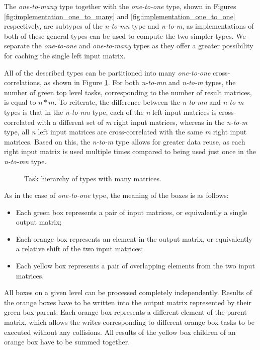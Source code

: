 The \textit{one-to-many} type together with the \textit{one-to-one} type, shown in Figures \ref{fig:implementation_one_to_many} and \ref{fig:implementation_one_to_one} respectively, are subtypes of the \textit{n-to-mn} type and \textit{n-to-m}, as implementations of both of these general types can be used to compute the two simpler types. We separate the \textit{one-to-one} and \textit{one-to-many} types as they offer a greater possibility for caching the single left input matrix.

All of the described types can be partitioned into many \textit{one-to-one} cross-correlations, as shown in Figure \ref{fig:cross_corr_many_tasks}. For both \textit{n-to-mn} and \textit{n-to-m} types, the number of green top level tasks, corresponding to the number of result matrices, is equal to $n*m$. To reiterate, the difference between the \textit{n-to-mn} and \textit{n-to-m} types is that in the \textit{n-to-mn} type, each of the \textit{n} left input matrices is cross-correlated with a different set of \textit{m} right input matrices, whereas in the \textit{n-to-m} type, all \textit{n} left input matrices are cross-correlated with the same \textit{m} right input matrices. Based on this, the \textit{n-to-m} type allows for greater data reuse, as each right input matrix is used multiple times compared to being used just once in the \textit{n-to-mn} type. 

\begin{figure}[ht]
	\centering
	\def\svgwidth{0.8\textwidth}
	
	\caption{Task hierarchy of types with many matrices.}
	\label{fig:cross_corr_many_tasks}
\end{figure}

As in the case of \textit{one-to-one} type, the meaning of the boxes is as follows:

\begin{itemize}
	\item Each green box represents a pair of input matrices, or equivalently a single output matrix;
	\item Each orange box represents an element in the output matrix, or equivalently a relative shift of the two input matrices;
	\item Each yellow box represents a pair of overlapping elements from the two input matrices.
\end{itemize}

All boxes on a given level can be processed completely independently.  Results of the orange boxes have to be written into the output matrix represented by their green box parent. Each orange box represents a different element of the parent matrix, which allows the writes corresponding to different orange box tasks to be executed without any collisions. All results of the yellow box children of an orange box have to be summed together.


